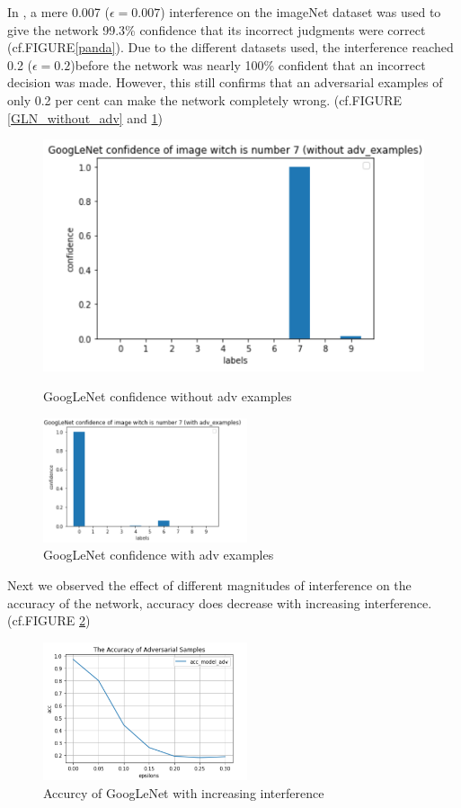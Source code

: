 In \cite{szegedy2013intriguing}, a mere 0.007 ($\epsilon=0.007$) interference on the imageNet dataset was used to give the network 99.3\% confidence that its incorrect judgments were correct (cf.FIGURE\ref{panda}). Due to the different datasets used, the interference reached 0.2 ($\epsilon=0.2$)before the network was nearly 100\% confident that an incorrect decision was made. However, this still confirms that an adversarial examples of only 0.2 per cent can make the network completely wrong. (cf.FIGURE \ref{GLN_without_adv} and \ref{GLN_with_adv})

\begin{figure}[htbp]
\centering
\begin{minipage}[t]{0.48\textwidth}
\centering
\includegraphics[width=6 cm]{GLN confiance without adv 7.png}
\caption{GoogLeNet confidence without adv examples}
\label{GLN_without_adv}
\end{minipage}
\begin{minipage}[t]{0.48\textwidth}
\centering
\includegraphics[width=6cm]{GLN confiance with adv 7.png}
\caption{GoogLeNet confidence with adv examples}
\label{GLN_with_adv}
\end{minipage}
\end{figure}
Next we observed the effect of different magnitudes of interference on the accuracy of the network, accuracy does decrease with increasing interference. (cf.FIGURE \ref{acc_GLN})
\FloatBarrier
\begin{figure}[htbp]
        \centering
        \includegraphics[width=6cm]{Acc of GLN with adv exp.PNG}%
        \caption{Accurcy of GoogLeNet with increasing interference}
        \label{acc_GLN}
\end{figure}\par
\FloatBarrier

